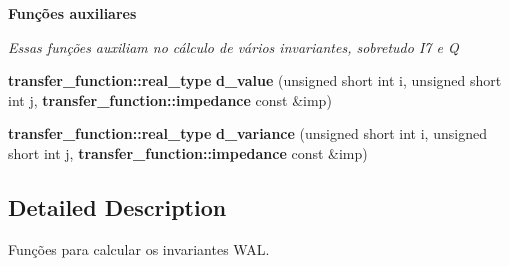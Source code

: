 \begin{Indent}{\bf Funções auxiliares}\par
{\em Essas funções auxiliam no cálculo de vários invariantes, sobretudo I7 e Q }\begin{CompactItemize}
\item 
{\bf transfer\_\-function::real\_\-type} \textbf{d\_\-value} (unsigned short int i, unsigned short int j, {\bf transfer\_\-function::impedance} const \&imp)\label{namespaceerro__manual_1_1base__xi__eta_1_1wal__invariant_ad1a73f71b9cfc1d672f265bac481474}

\item 
{\bf transfer\_\-function::real\_\-type} \textbf{d\_\-variance} (unsigned short int i, unsigned short int j, {\bf transfer\_\-function::impedance} const \&imp)\label{namespaceerro__manual_1_1base__xi__eta_1_1wal__invariant_fc6f2882232718aaed69f241c6523f25}

\end{CompactItemize}
\end{Indent}


\subsection{Detailed Description}
Funções para calcular os invariantes WAL. 